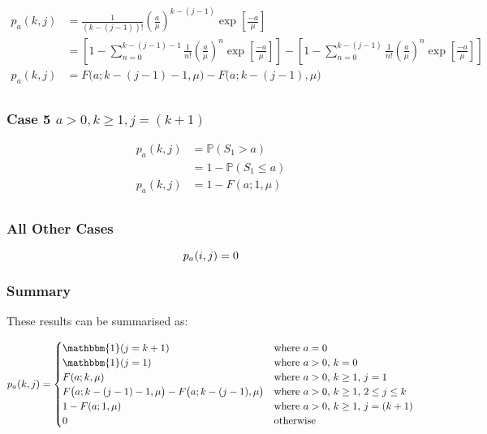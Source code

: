 \documentclass{article}
\begin{document}
\begin{align*}
	p_{a} (k, j) & = \frac{1}{(k - (j - 1))!} \left( \frac{a}{\mu} \right)^{k - (j - 1)} \exp \left[ \frac{-a}{\mu} \right] \\
	& = \left[ 1 - \sum_{n = 0}^{k - (j - 1) - 1} \frac{1}{n!} \left( \frac{a}{\mu} \right)^{n} \exp \left[ \frac{-a}{\mu} \right] \right] - \left[ 1 - \sum_{n = 0}^{k - (j - 1)} \frac{1}{n!} \left( \frac{a}{\mu} \right)^{n} \exp \left[ \frac{-a}{\mu} \right] \right] \\
	p_{a} (k, j) & = F \Big( a; k - (j - 1) - 1, \mu \Big) - F \Big( a; k - (j - 1), \mu \Big) \\
\end{align*}

\subsubsection{Case 5 $a > 0, k \geq 1, j = (k + 1)$}

\begin{align*}
	p_{a} (k, j) & = \mathbb{P} (S_{1} > a) \\
	& = 1 - \mathbb{P} (S_{1} \leq a) \\
	p_{a} (k, j) & = 1 - F (a; 1, \mu) \\
\end{align*}

\subsubsection{All Other Cases}

\begin{equation*}
	p_{a} (i, j) = 0 \\
\end{equation*}

\subsubsection{Summary}

These results can be summarised as:

\begin{equation}
	p_{a} (k, j) = \begin{cases} \mathbbm{1} (j = k + 1) & \text{where $a = 0$} \\
						\mathbbm{1} (j = 1) & \text{where $a > 0$, $k = 0$} \\
						F (a; k, \mu) & \text{where $a > 0$, $k \geq 1$, $j = 1$} \\
						F \big( a; k - (j - 1) - 1, \mu \big) - F \big( a; k - (j - 1), \mu \big) & \text{where $a > 0$, $k \geq 1$, $2 \leq j \leq k$} \\
						1 - F (a; 1, \mu) & \text{where $a > 0$, $k \geq 1$, $j = (k + 1)$} \\
						0 & \text{otherwise} \end{cases}
\end{equation}
\end{document}
